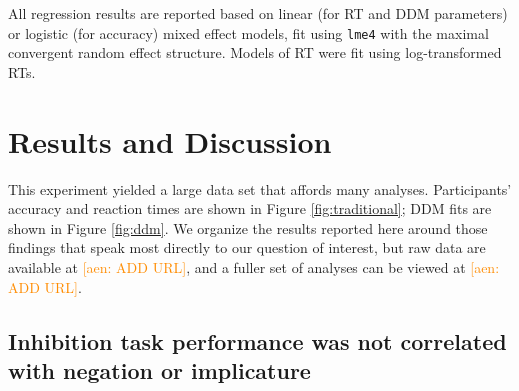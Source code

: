 \documentclass[10pt,letterpaper]{article}
\newcommand{\aen}[1]{\textcolor{DarkOrange}{[aen: #1]}}
\begin{document}
All regression results are reported based on linear (for RT and DDM parameters) or logistic (for accuracy) mixed effect models, fit using \texttt{lme4} with the maximal convergent random effect structure. Models of RT were fit using log-transformed RTs.


\section{Results and Discussion}

This experiment yielded a large data set that affords many analyses.  Participants' accuracy and reaction times are shown in Figure \ref{fig:traditional}; DDM fits are shown in Figure \ref{fig:ddm}. We organize the results reported here around those findings that speak most directly to our question of interest, but raw data are available at \aen{ADD URL}, and a fuller set of analyses can be viewed at \aen{ADD URL}.


\subsection{Inhibition task performance was not correlated with negation or implicature}

\end{document}

